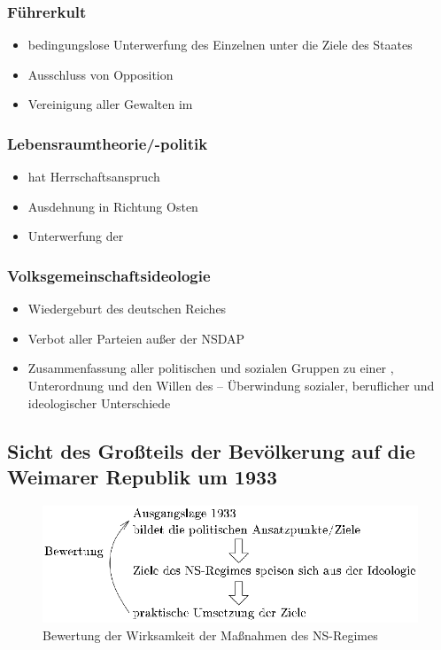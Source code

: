 \subsubsection{Führerkult}

\begin{itemize}
\item bedingungslose Unterwerfung des Einzelnen unter die Ziele des
Staates
\item Ausschluss von Opposition
\item Vereinigung aller Gewalten im  
\end{itemize}


\subsubsection{Lebensraumtheorie/-politik}

\begin{itemize}
\item {} hat Herrschaftsanspruch
\item Ausdehnung in Richtung Osten
\item Unterwerfung der 
\end{itemize}


\subsubsection{Volksgemeinschaftsideologie}

\begin{itemize}
\item Wiedergeburt des deutschen Reiches
\item Verbot aller Parteien außer der NSDAP
\item Zusammenfassung aller politischen und sozialen Gruppen zu einer
, Unterordnung und den Willen des 
-- Überwindung sozialer, beruflicher und ideologischer Unterschiede
\end{itemize}


\subsection{Sicht des Großteils der Bevölkerung auf die Weimarer
Republik um 1933}

\begin{figure}
\centering
\includegraphics{bew-mass-ns.eps}
\caption{Bewertung der Wirksamkeit der Maßnahmen des NS-Regimes}
\label{pic:bew-mass-ns}
\end{figure}

